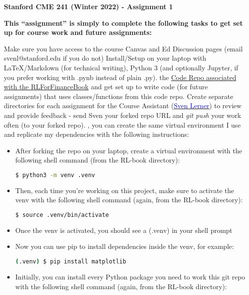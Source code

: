 \documentclass[12pt]{exam}
\begin{document}
\begin{center}
{\large {\bf Stanford CME 241 (Winter 2022) - Assignment 1}}
\end{center}
 
{\large{\bf This ``assignment'' is simply to complete the following tasks to get set up for course work and future assignments:}}
\begin{questions}
\question Make sure you have access to the course Canvas and Ed Discussion pages (email svenl@stanford.edu if you do not)
\question Install/Setup on your laptop with LaTeX/Markdown (for technical writing), Python 3 (and optionally Jupyter, if you prefer working with .pynb instead of plain .py).
 the \href{https://github.com/TikhonJelvis/RL-book}{Code Repo associated with the RLForFinanceBook} and get set up to write code (for future assignments) that uses classes/functions from this code repo.
\question Create separate directories for each assignment for the Course Assistant (\href{mailto:svenl@stanford.edu}{\underline{\textcolor{blue}{Sven Lerner}}}) to review and provide feedback - send Sven your forked repo URL and {\em git push} your work often (to your forked repo).
, you can create the same virtual environment I use and replicate my dependencies with the following instructions:
\begin{itemize}
\item After forking the repo on your laptop, create a virtual environment with the following shell command (from the RL-book directory):
\begin{lstlisting}[language=bash]
$ python3 -m venv .venv
\end{lstlisting}
\item Then, each time you're working on this project, make sure to activate the venv with the following shell command (again, from the RL-book directory):
\begin{lstlisting}[language=bash]
$ source .venv/bin/activate
\end{lstlisting}
\item Once the venv is activated, you should see a (.venv) in your shell prompt
\item Now you can use pip to install dependencies inside the venv, for example:
\begin{lstlisting}[language=bash]
(.venv) $ pip install matplotlib
\end{lstlisting}
\item Initially, you can install every Python package you need to work this git repo with the following shell command (again, from the RL-book directory):

\end{itemize}
\end{questions}
\end{document}
